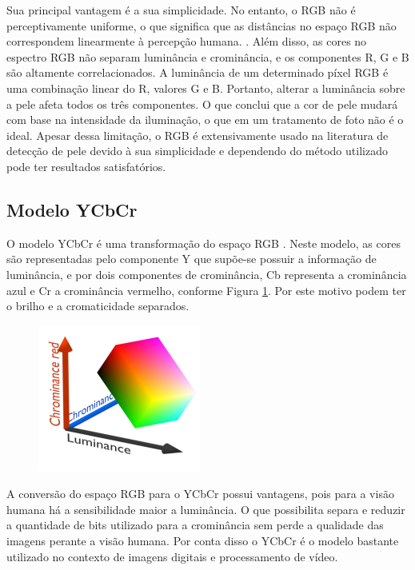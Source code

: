 Sua principal vantagem é a sua simplicidade. No entanto, o RGB não é perceptivamente uniforme, o que significa que as distâncias no espaço RGB não correspondem linearmente à percepção humana. \cite{Skin_detection_ashort_tutorial}. Além disso, as cores no espectro RGB não separam luminância e crominância, e os componentes R, G e B são altamente correlacionados. A luminância de um determinado píxel RGB é uma combinação linear do R, valores G e B. Portanto, alterar a luminância sobre a pele afeta todos os três componentes. O que conclui que a cor de pele mudará com base na intensidade da iluminação, o que em um tratamento de foto não é o ideal. Apesar dessa limitação, o RGB é extensivamente usado na literatura de detecção de pele devido à sua simplicidade e dependendo do método utilizado pode ter resultados satisfatórios.


 \subsection{Modelo YCbCr}
O modelo YCbCr é uma transformação do espaço RGB \cite{Deteccao_de_pele_humana_em_imagens_veiculadas_na_web}. Neste modelo, as cores são representadas pelo componente Y que supõe-se possuir a informação de luminância, e por dois componentes de crominância, Cb representa a crominância azul e Cr a crominância vermelho, conforme Figura \ref{fig: ycbcr }. Por este motivo podem ter o brilho e a cromaticidade separados. 

\begin{figure}[h]
\caption{}
\centering

\includegraphics[]{Template_Latex_TCC-UNIFTEC/_lib/imagens/ycbcr.png}

\label{fig: ycbcr }
\end{figure}

A conversão do espaço RGB para o YCbCr possui vantagens, pois para a visão humana há a sensibilidade maior a luminância. O que possibilita separa e reduzir a quantidade de bits utilizado para a crominância sem perde a qualidade das imagens perante a visão humana. Por conta disso o YCbCr é o modelo bastante utilizado no contexto de imagens digitais e processamento de vídeo.
 

